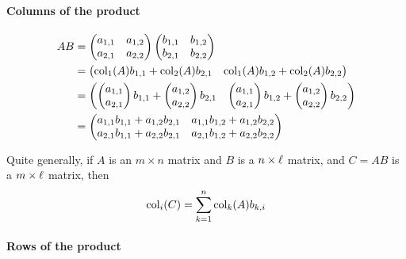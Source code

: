\documentclass{ximera}
\begin{document}
\paragraph{Columns of the product}
\begin{align*}AB &= \begin{pmatrix}
a_{1,1} & a_{1,2}\\
a_{2,1} & a_{2,2}
\end{pmatrix}
\begin{pmatrix}
b_{1,1} & b_{1,2}\\
b_{2,1} & b_{2,2}
\end{pmatrix}\\
&= \begin{pmatrix}
\operatorname{col}_1(A)b_{1,1} + \operatorname{col}_2(A) b_{2,1} & \operatorname{col}_1(A)b_{1,2} + \operatorname{col}_2(A) b_{2,2}
\end{pmatrix}\\
&= \begin{pmatrix}
\begin{pmatrix}a_{1,1} \\ a_{2,1}\end{pmatrix}b_{1,1} + \begin{pmatrix}a_{1,2} \\ a_{2,2}\end{pmatrix}b_{2,1} & \begin{pmatrix}a_{1,1} \\ a_{2,1}\end{pmatrix}b_{1,2} + \begin{pmatrix}a_{1,2} \\ a_{2,2}\end{pmatrix}b_{2,2}
\end{pmatrix}\\
&= \begin{pmatrix}
a_{1,1}b_{1,1} + a_{1,2}b_{2,1} & a_{1,1}b_{1,2}+ a_{1,2}b_{2,2}\\
a_{2,1}b_{1,1} + a_{2,2}b_{2,1} & a_{2,1}b_{1,2} + a_{2,2}b_{2,2}
\end{pmatrix}
\end{align*}

Quite generally, if $A$ is an $m\times n$ matrix and $B$ is a $n\times
\ell$ matrix, and $C = AB$ is a $m\times \ell$ matrix, then
\[
\operatorname{col}_i(C) = \sum_{k=1}^n \operatorname{col}_k(A)b_{k,i}
\]



\paragraph{Rows of the product}
\end{document}
